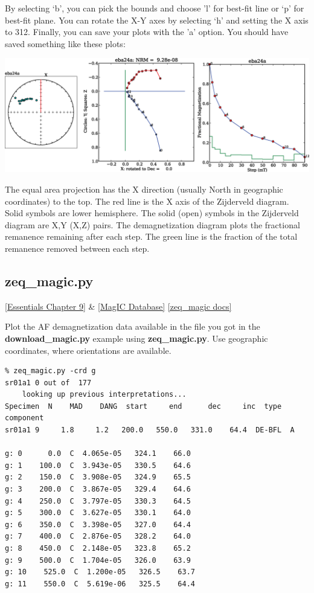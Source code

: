 \documentclass[11pt]{book}
\begin{document}
{ By selecting `b', you can pick the bounds and choose 'l' for best-fit line or  `p' for best-fit plane.  You can rotate the X-Y axes  by selecting `h' and setting the X axis to 312.   Finally, you can save your plots with the 'a' option.   You should have saved something like these plots:

{ %
\includegraphics[width=15cm]{EPSfiles/zeq.eps}}

The equal area projection has the X direction (usually North in geographic coordinates)
          to the top.  The red line is the X axis of the Zijderveld diagram.  Solid symbols are lower hemisphere.
          The solid (open) symbols in the Zijderveld diagram are X,Y (X,Z) pairs.  The demagnetization diagram plots the
          fractional remanence remaining after each step. The green line is the fraction of the total remanence removed
          between each step.




\subsection{zeq\_magic.py}
\href{http://earthref.org/MAGIC/books/Tauxe/Essentials/WebBook3ch9.html#ch9}{[Essentials Chapter 9]}  \& \href{#MagICDatabase}{[MagIC Database]}
\href{https://github.com/PmagPy/PmagPy/blob/master/programs/zeq_magic.py}{[zeq\_magic docs]}


Plot the AF demagnetization data available in the file you got in the {\bf download\_magic.py} example using {\bf zeq\_magic.py}.    Use geographic coordinates, where orientations are available.

\begin{verbatim}
% zeq_magic.py -crd g
sr01a1 0 out of  177
    looking up previous interpretations...
Specimen  N    MAD    DANG  start     end      dec     inc  type  component
sr01a1 9     1.8     1.2   200.0   550.0   331.0    64.4  DE-BFL  A

g: 0      0.0  C  4.065e-05   324.1    66.0
g: 1    100.0  C  3.943e-05   330.5    64.6
g: 2    150.0  C  3.908e-05   324.9    65.5
g: 3    200.0  C  3.867e-05   329.4    64.6
g: 4    250.0  C  3.797e-05   330.3    64.5
g: 5    300.0  C  3.627e-05   330.1    64.0
g: 6    350.0  C  3.398e-05   327.0    64.4
g: 7    400.0  C  2.876e-05   328.2    64.0
g: 8    450.0  C  2.148e-05   323.8    65.2
g: 9    500.0  C  1.704e-05   326.0    63.9
g: 10    525.0  C  1.200e-05   326.5    63.7
g: 11    550.0  C  5.619e-06   325.5    64.4


\end{verbatim}}
\end{document}
